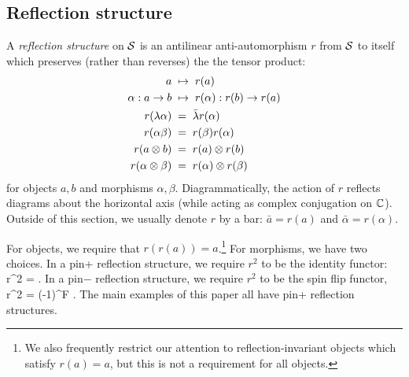 \subsection{Reflection structure} \label{reflection_ss}

A {\it reflection structure} on $\mathcal{S}$ is an antilinear anti-automorphism $r$ from $\mathcal{S}$ to itself which preserves (rather than reverses) 
the the tensor product:
\begin{align}
	a & \; \mapsto \; r(a) \\
	\alpha: a\to b & \; \mapsto \; r(\alpha): r(b) \to r(a) \\
	r(\lambda \alpha) & \;=\;  \bar\lambda r(\alpha) \\
	r(\alpha\beta) & \;=\; r(\beta)r(\alpha) \\
	r(a\otimes b) & \;=\;  r(a) \otimes r(b) \\
	r(\alpha\otimes \beta) & \;=\;  r(\alpha) \otimes r(\beta)
\end{align}
for objects $a,b$ and morphisms $\alpha,\beta$.  Diagrammatically, the action of  $r$ 
reflects diagrams about the horizontal axis (while acting as complex conjugation on $\mathbb{C}$). 
Outside of this section, we usually denote $r$ by a bar: $\bar a = r(a)$ and $\bar\alpha = r(\alpha)$.

For objects, we require that $r(r(a)) = a$.\footnote{
We also frequently restrict our attention to reflection-invariant objects which satisfy
$r(a) = a$, but this is not a requirement for all objects.}
For morphisms, we have two choices.
In a pin+ reflection structure, we require $r^2$ to be the identity functor:
\be
	r^2 = \id .
\ee
In a pin$-$ reflection structure, we require $r^2$ to be the spin flip functor,
\be
	r^2 = (-1)^F .
\ee
The main examples of this paper all have pin+ reflection structures.

